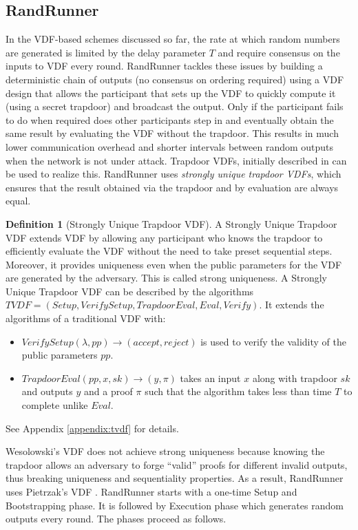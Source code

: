 \documentclass[letterpaper,twocolumn,10pt]{article}
\theoremstyle{definition}
\newtheorem{definition}[theorem]{Definition}
\theoremstyle{remark}
\begin{document}
\subsection{RandRunner}
In the VDF-based schemes discussed so far, the rate at which random numbers are generated is limited by the delay parameter $T$ and require consensus on the inputs to VDF every round. RandRunner \cite{schindler2021randrunner} tackles these issues by building a deterministic chain of outputs (no consensus on ordering required) using a VDF design that allows the participant that sets up the VDF to quickly compute it (using a secret trapdoor) and broadcast the output. Only if the participant fails to do when required does other participants step in and eventually obtain the same result by evaluating the VDF without the trapdoor. This results in much lower communication overhead and shorter intervals between random outputs when the network is not under attack. Trapdoor VDFs, initially described in \cite{wesolowski2019efficient} can be used to realize this. RandRunner uses \emph{strongly unique trapdoor VDFs}, which ensures that the result obtained via the trapdoor and by evaluation are always equal.
\begin{definition}[Strongly Unique Trapdoor VDF]
A Strongly Unique Trapdoor VDF extends VDF by allowing any participant who knows the trapdoor to efficiently evaluate the VDF without the need to take preset sequential steps. Moreover, it provides uniqueness even when the public parameters for the VDF are generated by the adversary. This is called strong uniqueness. A Strongly Unique Trapdoor VDF can be described by the algorithms $TVDF = (Setup,VerifySetup, TrapdoorEval, Eval, Verify)$. It extends the algorithms of a traditional VDF with:
\begin{itemize}
    \item $VerifySetup(\lambda, pp) \rightarrow (accept, reject)$ is used to verify the validity of the public parameters $pp$.
    \item $TrapdoorEval(pp,x,sk) \rightarrow (y, \pi)$ takes an input $x$  along with trapdoor $sk$ and outputs $y$ and a proof $\pi$ such that the algorithm takes less than time $T$ to complete unlike $Eval$.
\end{itemize}
See Appendix \ref{appendix:tvdf} for details.
\end{definition}
Wesolowski’s VDF \cite{wesolowski2019efficient} does not achieve strong uniqueness because knowing the trapdoor allows an adversary to forge ``valid'' proofs for different invalid outputs, thus breaking uniqueness and sequentiality properties. As a result, RandRunner uses Pietrzak's VDF \cite{pietrzak2018simple}. RandRunner starts with a one-time Setup and Bootstrapping phase. It is followed by Execution phase which generates random outputs every round. The phases proceed as follows.
\end{document}
